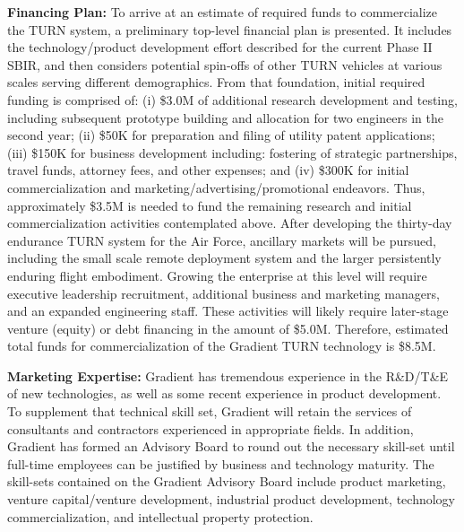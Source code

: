 \documentclass[11pt]{article}
\begin{document}
{\bf Financing Plan:}
To arrive at an estimate of required funds to commercialize the TURN system, a preliminary top-level financial plan is presented.  It includes the technology/product development effort described for the current Phase II SBIR, and then considers potential spin-offs of other TURN vehicles at various scales serving different demographics.  From that foundation, initial required funding is comprised of: (i) \$3.0M of additional research development and testing, including subsequent prototype building and allocation for two engineers in the second year; (ii) \$50K for preparation and filing of utility patent applications; (iii) \$150K for business development including: fostering of strategic partnerships, travel funds, attorney fees, and other expenses; and (iv) \$300K for initial commercialization and marketing/advertising/promotional endeavors.  Thus, approximately \$3.5M is needed to fund the remaining research and initial commercialization activities contemplated above.  After developing the thirty-day endurance TURN system for the Air Force, ancillary markets will be pursued, including the small scale remote deployment system and the larger persistently enduring flight embodiment.  Growing the enterprise at this level will require executive leadership recruitment, additional business and marketing managers, and an expanded engineering staff.  These activities will likely require later-stage venture (equity) or debt financing in the amount of \$5.0M.  Therefore, estimated total funds for commercialization of the Gradient TURN technology is \$8.5M.


{\bf Marketing Expertise:}
Gradient has tremendous experience in the R\&D/T\&E of new technologies, as well as some recent experience in product development.  To supplement that technical skill set, Gradient will retain the services of consultants and contractors experienced in appropriate fields.  In addition, Gradient has formed an Advisory Board to round out the necessary skill-set until full-time employees can be justified by business and technology maturity.  The skill-sets contained on the Gradient Advisory Board include product marketing, venture capital/venture development, industrial product development, technology commercialization, and intellectual property protection.








\end{document}
